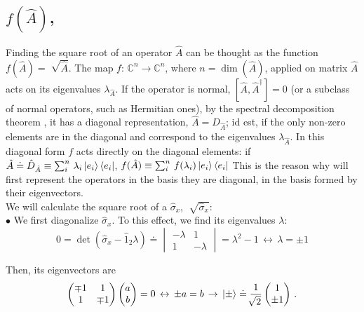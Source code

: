 \documentclass[11pt]{article}
\numberwithin{equation}{section} %
\numberwithin{figure}{section} %
\begin{document}
\begin{appendices}
\vspace{0.5cm}
\subsection{  $f(\hat{A})$, } 

Finding the square root of an operator $\hat{A}$ can be thought as the function $f(\hat{A})=\sqrt[]{\hat{A}}$. The map $f:\,\mathbb{C}^n\to\mathbb{C}^n$, where $n=\dim(\hat{A})$, applied on matrix $\hat{A}$ acts on its eigenvalues $\lambda_{\hat{A}}$. If the operator is normal, $[\hat{A},\hat{A}^\dagger]=0$ (or a subclass of normal operators, such as Hermitian ones), by the spectral decomposition theorem \cite[p.~72, Theo.~2.1]{Nielsen}, it has a diagonal representation, $\hat{A}=D_{\hat{A}}$; id est, if the only non-zero elements are in the diagonal and correspond to the eigenvalues $\lambda_{\hat{A}}$. In this diagonal form $f$ acts directly on the diagonal elements: if $\hat{A}\doteq\hat{D}_{\hat{A}}\equiv \sum_i^{n}\,\lambda_i\ket{e_i}\bra{e_i}$, $f(\hat{A})\equiv\sum_i^n\,f(\lambda_i)\ket{e_i}\bra{e_i}$  This is the reason why will first represent the operators in the basis they are diagonal, in the basis formed by their eigenvectors.\\

We will calculate the square root of a $\hat{\sigma}_x$, $\sqrt[]{\hat{\sigma}_x}$:\\

\noindent $\bullet$ We first diagonalize $\hat{\sigma}_x$. To this effect, we find its eigenvalues $\lambda$:
\begin{equation}
0=\det\left( \hat{\sigma}_x -\hat{1}_2 \lambda \right) \doteq \begin{vmatrix}
-\lambda&1\\1&-\lambda
\end{vmatrix} = \lambda^2-1\,\leftrightarrow\, \lambda=\pm 1
\end{equation}

Then, its eigenvectors are
\begin{equation}
\begin{pmatrix}\mp 1&1\\1&\mp1\end{pmatrix} \begin{pmatrix}a\\b\end{pmatrix}=0\,\leftrightarrow\,\pm a=b\,\rightarrow\, \ket{\pm}\doteq \frac{1}{\sqrt[]{2}}\begin{pmatrix}1\\\pm 1\end{pmatrix}\,\textrm{.}
\end{equation}


\end{appendices}
\end{document}
